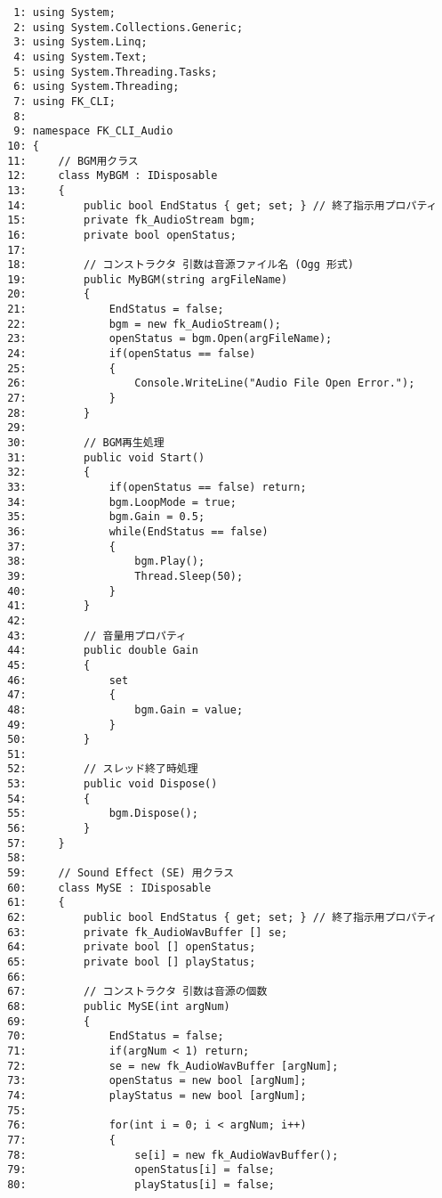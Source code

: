 \begin{breakbox}
\begin{small}
\begin{verbatim}
  1: using System;
  2: using System.Collections.Generic;
  3: using System.Linq;
  4: using System.Text;
  5: using System.Threading.Tasks;
  6: using System.Threading;
  7: using FK_CLI;
  8: 
  9: namespace FK_CLI_Audio
 10: {
 11:     // BGM用クラス
 12:     class MyBGM : IDisposable
 13:     {
 14:         public bool EndStatus { get; set; } // 終了指示用プロパティ
 15:         private fk_AudioStream bgm;
 16:         private bool openStatus;
 17: 
 18:         // コンストラクタ 引数は音源ファイル名 (Ogg 形式)
 19:         public MyBGM(string argFileName)
 20:         {
 21:             EndStatus = false;
 22:             bgm = new fk_AudioStream();
 23:             openStatus = bgm.Open(argFileName);
 24:             if(openStatus == false)
 25:             {
 26:                 Console.WriteLine("Audio File Open Error.");
 27:             }
 28:         }
 29: 
 30:         // BGM再生処理
 31:         public void Start()
 32:         {
 33:             if(openStatus == false) return;
 34:             bgm.LoopMode = true;
 35:             bgm.Gain = 0.5;
 36:             while(EndStatus == false)
 37:             {
 38:                 bgm.Play();
 39:                 Thread.Sleep(50);
 40:             }
 41:         }
 42: 
 43:         // 音量用プロパティ
 44:         public double Gain
 45:         {
 46:             set
 47:             {
 48:                 bgm.Gain = value;
 49:             }
 50:         }
 51: 
 52:         // スレッド終了時処理
 53:         public void Dispose()
 54:         {
 55:             bgm.Dispose();
 56:         }
 57:     }
 58: 
 59:     // Sound Effect (SE) 用クラス
 60:     class MySE : IDisposable
 61:     {
 62:         public bool EndStatus { get; set; } // 終了指示用プロパティ
 63:         private fk_AudioWavBuffer [] se;
 64:         private bool [] openStatus;
 65:         private bool [] playStatus;
 66: 
 67:         // コンストラクタ 引数は音源の個数
 68:         public MySE(int argNum)
 69:         {
 70:             EndStatus = false;
 71:             if(argNum < 1) return;
 72:             se = new fk_AudioWavBuffer [argNum];
 73:             openStatus = new bool [argNum];
 74:             playStatus = new bool [argNum];
 75: 
 76:             for(int i = 0; i < argNum; i++)
 77:             {
 78:                 se[i] = new fk_AudioWavBuffer();
 79:                 openStatus[i] = false;
 80:                 playStatus[i] = false;

\end{verbatim}
\end{small}
\end{breakbox}
